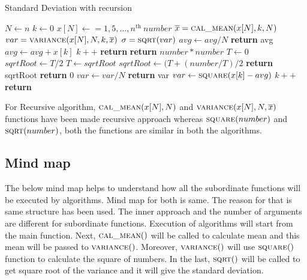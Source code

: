 \documentclass{scrartcl}
\begin{document}
\begin{algorithm}[H]
\caption{Standard Deviation with recursion}\label{alg:Standard Deviation with recursion}
\begin{algorithmic}
    \State $N \gets n$
    \State $k \gets 0$
    \State $x[N] \gets  = {1, 5, ..., n^{\text{th}}\ number}$
    \State $\overline{x} = \Call{cal\_mean}{x[N],k,N}$
    \State $var = \Call{variance}{x[N],N,k,\overline{x}}$
    \State $\sigma = \Call{sqrt}{var}$
\EndFunction
{}
        \State $avg \gets avg / N$
        \State \textbf{return} {avg}
    \Else
       \State $avg \gets avg + x[k]$
       \State $k++$
       \State \textbf{return} 
    \EndIf 
\EndFunction
{} 
    \State \textbf{return} {$number * number$} 
\EndFunction
{}
        \State $T \gets 0$
        \State $sqrtRoot \gets T/2$
        \Do
            \State $T \gets sqrtRoot$
            \State $sqrtRoot \gets (T + (number/T)/2$
        \State \textbf{return} {sqrtRoot}
    \Else
       \State \textbf{return} {0} 
    \EndIf 
\EndFunction
{}
        \State $var \gets var / N$
        \State \textbf{return} {var}
    \Else
       \State $var \gets \Call{square}{x[k] - avg}$
       \State $k++$
       \State \textbf{return} 
    \EndIf 
\EndFunction
\end{algorithmic}
\end{algorithm}
\begin{spacing}{1.5}
\begin{Large}
For Recursive algorithm, $\Call{cal\_mean}{x[N],N}$ and $\Call{variance}{x[N],N,\overline{x}}$ functions have been made recursive approach
whereas $\Call{square}{number}$ and $\Call{sqrt}{number}$, both the 
functions are similar in both the algorithms.
\end{Large}
\end{spacing}

\subsection{Mind map}

\begin{spacing}{1.5}
\begin{Large}
The below mind map helps to understand how all the subordinate functions will be executed by algorithms. Mind map for both is same. The reason for that is same structure has been used. The inner approach and the number of arguments are different for subordinate functions. Execution of algorithms will start from the main function. Next, $\Call{cal\_mean}$ will be called to calculate mean and this mean will be passed to $\Call{variance}$. Moreover, $\Call{variance}$ will use $\Call{square}$ function to calculate the square of numbers. In the last, $\Call{sqrt}$ will be called to get square root of the variance and it will give the standard deviation. 
\end{Large}
\end{spacing}
\end{document}

